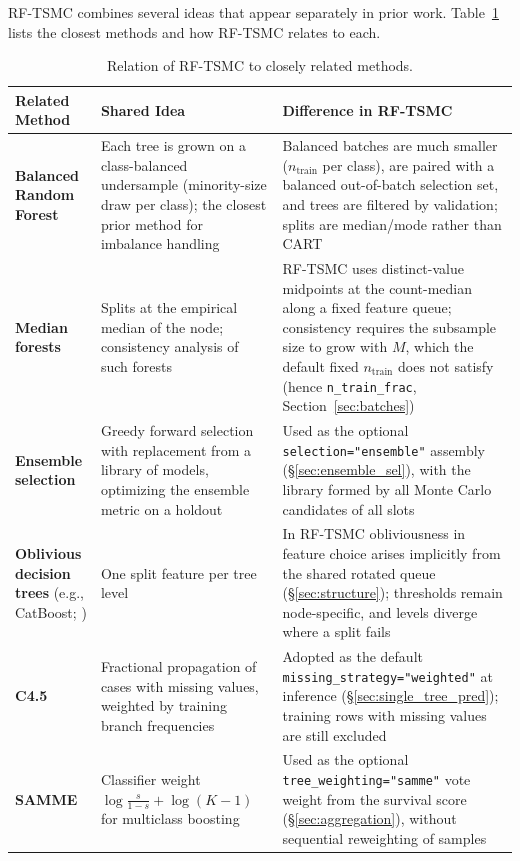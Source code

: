 \documentclass[11pt,a4paper]{article}
\newcommand{\code}[1]{\texttt{#1}}
\begin{document}
RF-TSMC combines several ideas that appear separately in prior work. Table~\ref{tab:related} lists the closest methods and how RF-TSMC relates to each.

\begin{table}[htbp]
  \centering
  \caption{Relation of RF-TSMC to closely related methods.}
  \label{tab:related}
  \footnotesize
  \renewcommand{\arraystretch}{1.28}
  \begin{tabularx}{\textwidth}{@{} >{\raggedright\arraybackslash}p{3.0cm} >{\raggedright\arraybackslash}X >{\raggedright\arraybackslash}X @{}}
    \toprule
    \textbf{Related Method} & \textbf{Shared Idea} & \textbf{Difference in RF-TSMC} \\
    \midrule
    \textbf{Balanced Random Forest} \citep{chen2004} & Each tree is grown on a class-balanced undersample (minority-size draw per class); the closest prior method for imbalance handling & Balanced batches are much smaller ($n_{\text{train}}$ per class), are paired with a balanced out-of-batch selection set, and trees are filtered by validation; splits are median/mode rather than CART \\
    \textbf{Median forests} \citep{duroux2018} & Splits at the empirical median of the node; consistency analysis of such forests & RF-TSMC uses distinct-value midpoints at the count-median along a fixed feature queue; consistency requires the subsample size to grow with $M$, which the default fixed $n_{\text{train}}$ does not satisfy (hence \code{n\_train\_frac}, Section~\ref{sec:batches}) \\
    \textbf{Ensemble selection} \citep{caruana2004} & Greedy forward selection with replacement from a library of models, optimizing the ensemble metric on a holdout & Used as the optional \code{selection="ensemble"} assembly (\S\ref{sec:ensemble_sel}), with the library formed by all Monte Carlo candidates of all slots \\
    \textbf{Oblivious decision trees} (e.g., CatBoost; \citealp{prokhorenkova2018}) & One split feature per tree level & In RF-TSMC obliviousness in feature choice arises implicitly from the shared rotated queue (\S\ref{sec:structure}); thresholds remain node-specific, and levels diverge where a split fails \\
    \textbf{C4.5} \citep{quinlan1993} & Fractional propagation of cases with missing values, weighted by training branch frequencies & Adopted as the default \code{missing\_strategy="weighted"} at inference (\S\ref{sec:single_tree_pred}); training rows with missing values are still excluded \\
    \textbf{SAMME} \citep{zhu2009} & Classifier weight $\log\frac{s}{1-s} + \log(K-1)$ for multiclass boosting & Used as the optional \code{tree\_weighting="samme"} vote weight from the survival score (\S\ref{sec:aggregation}), without sequential reweighting of samples \\
    \bottomrule
  \end{tabularx}
\end{table}
\end{document}
